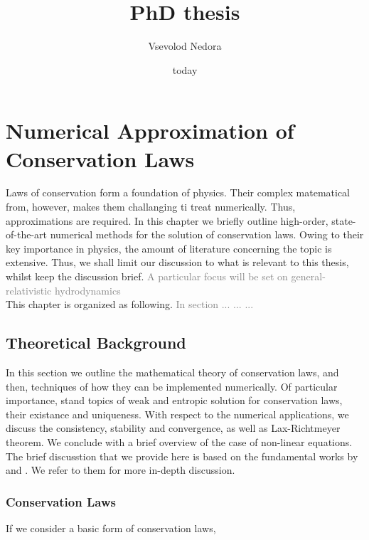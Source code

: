 \documentclass[11pt,a4paper,headinclude=true,DIV=14,BCOR=8mm,chapterprefix,listof=totoc,twoside,openright,abstracton]{scrbook}
\title{PhD thesis}
\author{Vsevolod Nedora}
\date{today}
\newcommand{\gray}[1]{\textcolor{gray}{#1}}
\begin{document}
    
    \maketitle


\chapter{Numerical Approximation of Conservation Laws}
\label{ch:nummethods}

Laws of conservation form a foundation of physics. Their complex matematical from, however, makes them challanging ti treat numerically. Thus, approximations are required. In this chapter we briefly outline high-order, state-of-the-art numerical methods for the solution of conservation laws. Owing to their key importance in physics, the amount of literature concerning the topic is extensive. Thus, we shall limit our discussion to what is relevant to this thesis, whilst keep the discussion brief. \gray{A particular focus will be set on general-relativistic hydrodynamics} \\

This chapter is organized as following. \gray{In section ... ... ... }

\section{Theoretical Background}
\label{sec:theory:conserv_laws:theorback}

In this section we outline the mathematical theory of conservation laws, and then, techniques of how they can be implemented numerically. Of particular importance, stand topics of weak and entropic solution for conservation laws, their existance and uniqueness. With respect to the numerical applications, we discuss the consistency, stability and convergence, as well as Lax-Richtmeyer theorem. We conclude with a brief overview of the case of non-linear equations. The brief discusstion that we provide here is based on the fundamental works by \cite{LeVeque:1992} and \cite{Tadmor1998}. We refer to them for more in-depth discussion. 

\subsection{Conservation Laws}

If we consider a basic form of conservation laws, 
\end{document}
